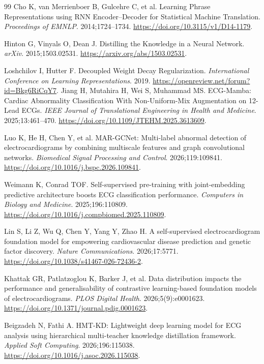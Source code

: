 \documentclass[11pt,a4paper]{article}
\begin{document}
\begin{thebibliography}{99}
 Cho K, van Merrienboer B, Gulcehre C, et al. Learning Phrase Representations using RNN Encoder--Decoder for Statistical Machine Translation. \emph{Proceedings of EMNLP}. 2014;1724--1734. \url{https://doi.org/10.3115/v1/D14-1179}.

 Hinton G, Vinyals O, Dean J. Distilling the Knowledge in a Neural Network. \emph{arXiv}. 2015;1503.02531. \url{https://arxiv.org/abs/1503.02531}.

 Loshchilov I, Hutter F. Decoupled Weight Decay Regularization. \emph{International Conference on Learning Representations}. 2019. \url{https://openreview.net/forum?id=Bkg6RiCqY7}.
 Jiang H, Mutahira H, Wei S, Muhammad MS. ECG-Mamba: Cardiac Abnormality Classification With Non-Uniform-Mix Augmentation on 12-Lead ECGs. \emph{IEEE Journal of Translational Engineering in Health and Medicine}. 2025;13:461--470. \url{https://doi.org/10.1109/JTEHM.2025.3613609}.

 Luo K, He H, Chen Y, et al. MAR-GCNet: Multi-label abnormal detection of electrocardiograms by combining multiscale features and graph convolutional networks. \emph{Biomedical Signal Processing and Control}. 2026;119:109841. \url{https://doi.org/10.1016/j.bspc.2026.109841}.

 Weimann K, Conrad TOF. Self-supervised pre-training with joint-embedding predictive architecture boosts ECG classification performance. \emph{Computers in Biology and Medicine}. 2025;196:110809. \url{https://doi.org/10.1016/j.compbiomed.2025.110809}.

 Lin S, Li Z, Wu Q, Chen Y, Yang Y, Zhao H. A self-supervised electrocardiogram foundation model for empowering cardiovascular disease prediction and genetic factor discovery. \emph{Nature Communications}. 2026;17:5771. \url{https://doi.org/10.1038/s41467-026-72436-2}.

 Khattak GR, Patlatzoglou K, Barker J, et al. Data distribution impacts the performance and generalisability of contrastive learning-based foundation models of electrocardiograms. \emph{PLOS Digital Health}. 2026;5(9):e0001623. \url{https://doi.org/10.1371/journal.pdig.0001623}.

 Beigzadeh N, Fathi A. HMT-KD: Lightweight deep learning model for ECG analysis using hierarchical multi-teacher knowledge distillation framework. \emph{Applied Soft Computing}. 2026;196:115038. \url{https://doi.org/10.1016/j.asoc.2026.115038}.


\end{thebibliography}
\end{document}
